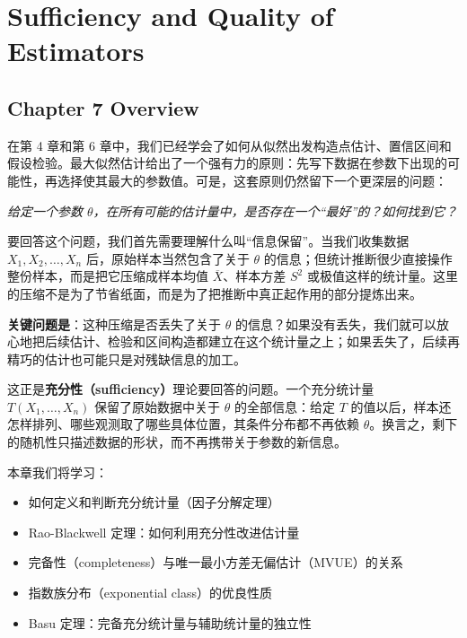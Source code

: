 
\chapter{Sufficiency and Quality of Estimators}\label{chap:sufficiency}

\section*{Chapter 7 Overview}

在第 4 章和第 6 章中，我们已经学会了如何从似然出发构造点估计、置信区间和假设检验。最大似然估计给出了一个强有力的原则：先写下数据在参数下出现的可能性，再选择使其最大的参数值。可是，这套原则仍然留下一个更深层的问题：

\begin{center}
\textit{给定一个参数 $\theta$，在所有可能的估计量中，是否存在一个``最好''的？如何找到它？}
\end{center}

要回答这个问题，我们首先需要理解什么叫``信息保留''。当我们收集数据 $X_1, X_2, \ldots, X_n$ 后，原始样本当然包含了关于 $\theta$ 的信息；但统计推断很少直接操作整份样本，而是把它压缩成样本均值 $\overline{X}$、样本方差 $S^2$ 或极值这样的统计量。这里的压缩不是为了节省纸面，而是为了把推断中真正起作用的部分提炼出来。

\textbf{关键问题是}：这种压缩是否丢失了关于 $\theta$ 的信息？如果没有丢失，我们就可以放心地把后续估计、检验和区间构造都建立在这个统计量之上；如果丢失了，后续再精巧的估计也可能只是对残缺信息的加工。

这正是\textbf{充分性（sufficiency）}理论要回答的问题。一个充分统计量 $T(X_1, \ldots, X_n)$ 保留了原始数据中关于 $\theta$ 的全部信息：给定 $T$ 的值以后，样本还怎样排列、哪些观测取了哪些具体位置，其条件分布都不再依赖 $\theta$。换言之，剩下的随机性只描述数据的形状，而不再携带关于参数的新信息。

本章我们将学习：
\begin{itemize}
\item 如何定义和判断充分统计量（因子分解定理）
\item Rao-Blackwell 定理：如何利用充分性改进估计量
\item 完备性（completeness）与唯一最小方差无偏估计（MVUE）的关系
\item 指数族分布（exponential class）的优良性质
\item Basu 定理：完备充分统计量与辅助统计量的独立性
\end{itemize}

